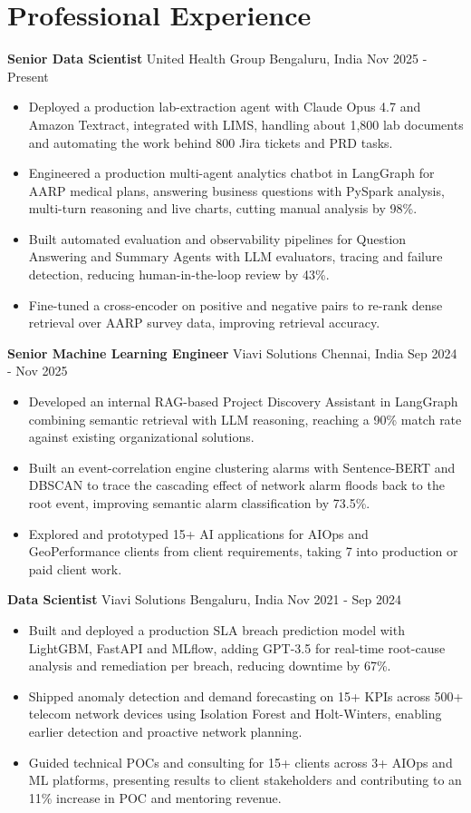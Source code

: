 \documentclass[10pt,a4paper]{article}
\newcommand{\role}[4]{\textbf{#1} \textbar{} #2 \hfill #3 \textbar{} #4\par}
\begin{document}
\section{Professional Experience}
\role{Senior Data Scientist}{United Health Group}{Bengaluru, India}{Nov 2025 - Present}
\begin{itemize}
  \item Deployed a production lab-extraction agent with Claude Opus 4.7 and Amazon Textract, integrated with LIMS, handling about 1,800 lab documents and automating the work behind 800 Jira tickets and PRD tasks.
  \item Engineered a production multi-agent analytics chatbot in LangGraph for AARP medical plans, answering business questions with PySpark analysis, multi-turn reasoning and live charts, cutting manual analysis by 98\%.
  \item Built automated evaluation and observability pipelines for Question Answering and Summary Agents with LLM evaluators, tracing and failure detection, reducing human-in-the-loop review by 43\%.
  \item Fine-tuned a cross-encoder on positive and negative pairs to re-rank dense retrieval over AARP survey data, improving retrieval accuracy.
\end{itemize}
\vspace{3pt}
\role{Senior Machine Learning Engineer}{Viavi Solutions}{Chennai, India}{Sep 2024 - Nov 2025}
\begin{itemize}
  \item Developed an internal RAG-based Project Discovery Assistant in LangGraph combining semantic retrieval with LLM reasoning, reaching a 90\% match rate against existing organizational solutions.
  \item Built an event-correlation engine clustering alarms with Sentence-BERT and DBSCAN to trace the cascading effect of network alarm floods back to the root event, improving semantic alarm classification by 73.5\%.
  \item Explored and prototyped 15+ AI applications for AIOps and GeoPerformance clients from client requirements, taking 7 into production or paid client work.
\end{itemize}
\vspace{3pt}
\role{Data Scientist}{Viavi Solutions}{Bengaluru, India}{Nov 2021 - Sep 2024}
\begin{itemize}
  \item Built and deployed a production SLA breach prediction model with LightGBM, FastAPI and MLflow, adding GPT-3.5 for real-time root-cause analysis and remediation per breach, reducing downtime by 67\%.
  \item Shipped anomaly detection and demand forecasting on 15+ KPIs across 500+ telecom network devices using Isolation Forest and Holt-Winters, enabling earlier detection and proactive network planning.
  \item Guided technical POCs and consulting for 15+ clients across 3+ AIOps and ML platforms, presenting results to client stakeholders and contributing to an 11\% increase in POC and mentoring revenue.
\end{itemize}
\end{document}
